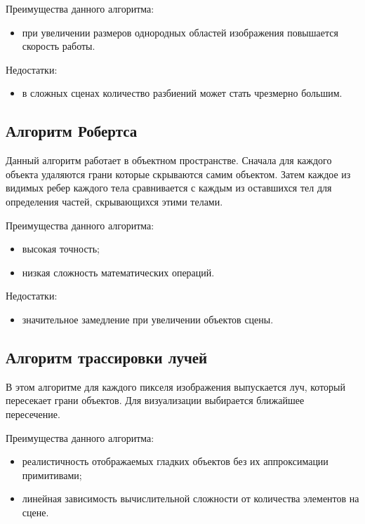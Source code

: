 Преимущества данного алгоритма:

\begin{itemize}
	\item при увеличении размеров однородных областей изображения повышается скорость работы.
\end{itemize}

Недостатки:

\begin{itemize}
	\item в сложных сценах количество разбиений может стать чрезмерно большим. 
\end{itemize}

\subsection{Алгоритм Робертса}

Данный алгоритм работает в объектном пространстве. Сначала для каждого объекта удаляются грани которые скрываются самим объектом. Затем каждое из видимых ребер каждого тела сравнивается с каждым из оставшихся тел для определения частей, скрывающихся этими телами.

Преимущества данного алгоритма:

\begin{itemize}
	\item высокая точность;
	\item низкая сложность математических операций.
\end{itemize}

Недостатки:

\begin{itemize}
	\item значительное замедление при увеличении объектов сцены.
\end{itemize}

\subsection{Алгоритм трассировки лучей}

В этом алгоритме для каждого пикселя изображения выпускается луч, который пересекает грани объектов. Для визуализации выбирается ближайшее пересечение.

Преимущества данного алгоритма:

\begin{itemize}
	\item реалистичность отображаемых гладких объектов без их аппроксимации примитивами;
	\item линейная зависимость вычислительной сложности от количества элементов на сцене. 
\end{itemize}

